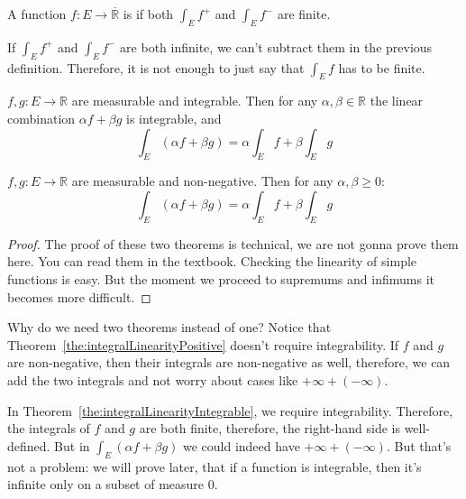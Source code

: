 \begin{definition}
    A function $f: E \to \overline{\mathbb{R}}$
    is  if both $\int_E f^+$ and $\int_E f^-$ are finite.
\end{definition}
\begin{remark}
    If $\int_E f^+$ and $\int_E f^-$ are both infinite, we can't subtract them in the previous
    definition. Therefore, it is not enough to just say that $\int_E f$ has to be finite.
\end{remark}

\begin{theorem}
    \label{the:integralLinearityIntegrable}
    $f, g: E \to \mathbb{R}$ are measurable and integrable. Then 
    for any $\alpha, \beta \in \mathbb{R}$ the linear combination
    $\alpha f + \beta g$ is integrable, and 
    \[ \int_E (\alpha f + \beta g) = \alpha \int_E f + \beta \int_E g \]
\end{theorem}
\begin{theorem}
    \label{the:integralLinearityPositive}
    $f, g: E \to \mathbb{R}$ are measurable and non-negative. Then for any 
    $\alpha, \beta \ge 0$:
    \[ \int_E (\alpha f + \beta g) = \alpha \int_E f + \beta \int_E g \]
\end{theorem}
\begin{proof}
    The proof of these two theorems is technical, we are not gonna prove them here.
    You can read them in the textbook.
    Checking the linearity of simple functions is easy. But the moment 
    we proceed to supremums and infimums it becomes more difficult.
\end{proof}
\begin{remark}
    Why do we need two theorems instead of one? Notice that 
    Theorem~\ref{the:integralLinearityPositive} doesn't 
    require integrability. If $f$ and $g$ are non-negative, then 
    their integrals are non-negative as well, therefore, we can add the two 
    integrals and not worry about cases like $+\infty + (-\infty)$.

    In Theorem~\ref{the:integralLinearityIntegrable}, we require integrability. Therefore, the integrals
    of $f$ and $g$ are both finite, therefore, the right-hand side is well-defined.
    But in $\int_E (\alpha f + \beta g)$ we could indeed have 
    $+\infty + (-\infty)$. But that's not a problem: we will prove later,
    that if a function is integrable, then it's infinite only on a subset
    of measure 0.
\end{remark}

